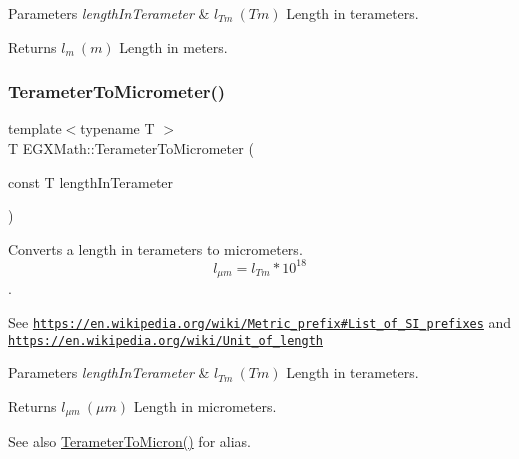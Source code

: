 \begin{DoxyParams}{Parameters}
{\em length\+In\+Terameter} & $ l_{Tm}\ (Tm)$ Length in terameters. \\
\hline
\end{DoxyParams}
\begin{DoxyReturn}{Returns}
$ l_{m}\ (m)$ Length in meters. 
\end{DoxyReturn}
\mbox{\label{group___e_g_x_math-_conversions-_length_conversions-_s_i-_terameter-_s_i_ga4f6fb943e4c16178f4060c01a9c00a02}} 
\subsubsection{\texorpdfstring{Terameter\+To\+Micrometer()}{TerameterToMicrometer()}}
{\footnotesize\ttfamily template$<$typename T $>$ \\
T E\+G\+X\+Math\+::\+Terameter\+To\+Micrometer (\begin{DoxyParamCaption}\item[{const T}]{length\+In\+Terameter }\end{DoxyParamCaption})}



Converts a length in terameters to micrometers. \[ l_{\mu m}=l_{Tm} * 10^{18} \]. 

See \href{https://en.wikipedia.org/wiki/Metric_prefix#List_of_SI_prefixes}{\tt https\+://en.\+wikipedia.\+org/wiki/\+Metric\+\_\+prefix\#\+List\+\_\+of\+\_\+\+S\+I\+\_\+prefixes} and \href{https://en.wikipedia.org/wiki/Unit_of_length}{\tt https\+://en.\+wikipedia.\+org/wiki/\+Unit\+\_\+of\+\_\+length} 
\begin{DoxyParams}{Parameters}
{\em length\+In\+Terameter} & $ l_{Tm}\ (Tm)$ Length in terameters. \\
\hline
\end{DoxyParams}
\begin{DoxyReturn}{Returns}
$ l_{\mu m}\ (\mu m)$ Length in micrometers. 
\end{DoxyReturn}
\begin{DoxySeeAlso}{See also}
\mbox{\hyperlink{group___e_g_x_math-_conversions-_length_conversions-_s_i-_terameter-_non-_s_i_gaa5fdc4aaf15e6428cf443e3d808403a3}{Terameter\+To\+Micron()}} for alias. 
\end{DoxySeeAlso}
\mbox{\label{group___e_g_x_math-_conversions-_length_conversions-_s_i-_terameter-_s_i_gaff9d9c2af8681eacbb3d5d01cb9f9cfa}} 
